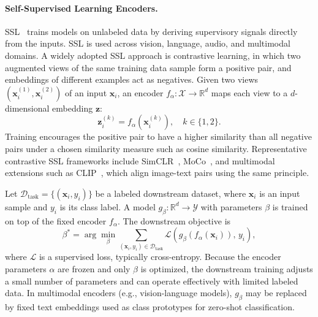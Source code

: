 \documentclass[letterpaper,twocolumn,10pt]{article}
\newcommand{\mn}[1]{\textcolor{orange!90!black}{Mahmoud: #1}}
\begin{document}
\paragraph{Self-Supervised Learning Encoders.}
SSL~\cite{9462394} trains models on unlabeled data by deriving supervisory signals directly from the inputs. SSL is used across vision, language, audio, and multimodal domains. A widely adopted SSL approach is contrastive learning, in which two augmented views of the same training data sample form a positive pair, and embeddings of different examples act as negatives. Given two views $(\mathbf{x}_i^{(1)}, \mathbf{x}_i^{(2)})$ of an input $\mathbf{x}_i$, an encoder $f_{\alpha}:\mathcal{X}\rightarrow\mathbb{R}^{d}$ maps each view to a $d$-dimensional embedding $\mathbf{z}$:
\[
\mathbf{z}_i^{(k)} = f_{\alpha}(\mathbf{x}_i^{(k)}), \quad k\in\{1,2\}.
\]
Training encourages the positive pair to have a higher similarity than all negative pairs under a chosen similarity measure such as cosine similarity. Representative contrastive SSL frameworks include SimCLR~\cite{chen2020simclr}, MoCo~\cite{he2020momentum}, and multimodal extensions such as CLIP~\cite{CLIP}, which align image-text pairs using the same principle.


Let $\mathcal{D}_{\text{task}}=\{(\mathbf{x}_i, y_i)\}$ be a labeled downstream dataset, where $\mathbf{x}_i$ is an input sample and $y_i$ is its class label. A model 
$g_{\beta}:\mathbb{R}^{d}\rightarrow\mathcal{Y}$ 
with parameters $\beta$ is trained on top of the fixed encoder $f_{\alpha}$. The downstream objective is
\begin{equation}
\label{eq:downstream}
\beta^{*} =
\arg\min_{\beta}
\sum_{(\mathbf{x}_i, y_i)\in\mathcal{D}_{\text{task}}}
\mathcal{L}\!\left(g_{\beta}(f_{\alpha}(\mathbf{x}_i)),\, y_i\right),
\end{equation}
where $\mathcal{L}$ is a supervised loss, typically cross-entropy. Because the encoder parameters $\alpha$ are frozen and only $\beta$ is optimized, the downstream training adjusts a small number of parameters and can operate effectively with limited labeled data. In multimodal encoders (e.g., vision-language models), $g_{\beta}$ may be replaced by fixed text embeddings used as class prototypes for zero-shot classification.


\end{document}
